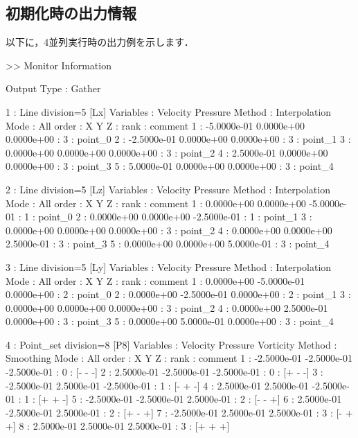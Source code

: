 \pagebreak
\subsection{初期化時の出力情報}
以下に，4並列実行時の出力例を示します．

{\small
\begin{program}
>> Monitor Information

  Output Type : Gather

  1 : Line   division=5  [Lx]
    Variables : Velocity Pressure 
       Method : Interpolation
         Mode : All
        order :            X            Y            Z  :   rank : comment
            1 :  -5.0000e-01   0.0000e+00   0.0000e+00  :      3 : point_0
            2 :  -2.5000e-01   0.0000e+00   0.0000e+00  :      3 : point_1
            3 :   0.0000e+00   0.0000e+00   0.0000e+00  :      3 : point_2
            4 :   2.5000e-01   0.0000e+00   0.0000e+00  :      3 : point_3
            5 :   5.0000e-01   0.0000e+00   0.0000e+00  :      3 : point_4

  2 : Line   division=5  [Lz]
    Variables : Velocity Pressure 
       Method : Interpolation
         Mode : All
        order :            X            Y            Z  :   rank : comment
            1 :   0.0000e+00   0.0000e+00  -5.0000e-01  :      1 : point_0
            2 :   0.0000e+00   0.0000e+00  -2.5000e-01  :      1 : point_1
            3 :   0.0000e+00   0.0000e+00   0.0000e+00  :      3 : point_2
            4 :   0.0000e+00   0.0000e+00   2.5000e-01  :      3 : point_3
            5 :   0.0000e+00   0.0000e+00   5.0000e-01  :      3 : point_4

  3 : Line   division=5  [Ly]
    Variables : Velocity Pressure 
       Method : Interpolation
         Mode : All
        order :            X            Y            Z  :   rank : comment
            1 :   0.0000e+00  -5.0000e-01   0.0000e+00  :      2 : point_0
            2 :   0.0000e+00  -2.5000e-01   0.0000e+00  :      2 : point_1
            3 :   0.0000e+00   0.0000e+00   0.0000e+00  :      3 : point_2
            4 :   0.0000e+00   2.5000e-01   0.0000e+00  :      3 : point_3
            5 :   0.0000e+00   5.0000e-01   0.0000e+00  :      3 : point_4

  4 : Point_set  division=8  [P8]
    Variables : Velocity Pressure Vorticity 
       Method : Smoothing
         Mode : All
        order :            X            Y            Z  :   rank : comment
            1 :  -2.5000e-01  -2.5000e-01  -2.5000e-01  :      0 : [- - -]
            2 :   2.5000e-01  -2.5000e-01  -2.5000e-01  :      0 : [+ - -]
            3 :  -2.5000e-01   2.5000e-01  -2.5000e-01  :      1 : [- + -]
            4 :   2.5000e-01   2.5000e-01  -2.5000e-01  :      1 : [+ + -]
            5 :  -2.5000e-01  -2.5000e-01   2.5000e-01  :      2 : [- - +]
            6 :   2.5000e-01  -2.5000e-01   2.5000e-01  :      2 : [+ - +]
            7 :  -2.5000e-01   2.5000e-01   2.5000e-01  :      3 : [- + +]
            8 :   2.5000e-01   2.5000e-01   2.5000e-01  :      3 : [+ + +]


\end{program}}
